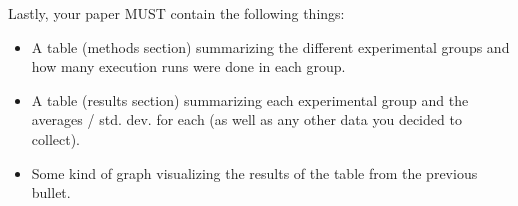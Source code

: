 \documentclass[paper=a4, fontsize=11pt, parskip=full]{scrartcl} %
\numberwithin{equation}{section} %
\numberwithin{figure}{section} %
\numberwithin{table}{section} %
\begin{document}
Lastly, your paper MUST contain the following things:

\begin{itemize}
	\item A table (methods section) summarizing the different experimental groups and how many execution runs were done in each group.
	\item A table (results section) summarizing each experimental group and the averages / std. dev. for each (as well as any other data you decided to collect).
	\item Some kind of graph visualizing the results of the table from the previous bullet.
\end{itemize}


\end{document}
